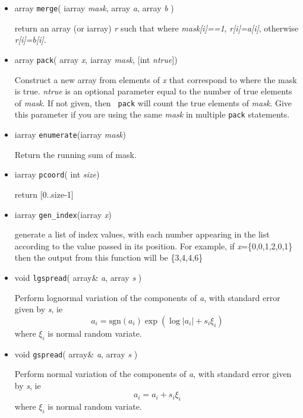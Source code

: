 \begin{itemize}
\item array {\tt merge}( iarray {\em mask}, array {\em
    a}, array {\em b} )
  
  return an array (or iarray) {\em r} such that where {\em
    mask[i]==1}, {\em r[i]=a[i]}, otherwise {\em r[i]=b[i]}.

\item array {\tt pack}( array {\em x}, iarray {\em mask}, [int {\em
ntrue}])

Construct a new array from elements of  {\em x} that correspond to
where the mask is true. {\em ntrue} is an optional parameter equal to
the number of true elements of {\em mask}. If not given, then {\tt
pack} will count the true elements of {\em mask}. Give this parameter
if you are using the same {\em mask} in multiple {\tt pack} statements.

\item iarray {\tt enumerate}(iarray {\em mask})

Return the running sum of mask.

\item iarray {\tt pcoord}( int {\em size})

return [0..size-1]

\item iarray {\tt gen\_index}(iarray {\em x}) 

generate a list of index values, with each number appearing in the
list according to the value passed in its position. For example, if
{\em x}=\{0,0,1,2,0,1\} then the output from this function will be
\{3,4,4,6\}

\item void {\tt lgspread}( array\& {\em a}, array {\em s} )

Perform lognormal variation of the components of {\em a}, with
standard error given by {\em s}, ie
\begin{displaymath}
a_i=\mathrm{sgn}(a_i) \exp(\log|a_i| + s_i\xi_i)
\end{displaymath}
where $\xi_i$ is normal random variate.

\item void {\tt gspread}( array\& {\em a}, array {\em s} )

Perform normal variation of the components of {\em a}, with
standard error given by {\em s}, ie
\begin{displaymath}
a_i = a_i + s_i\xi_i
\end{displaymath}
where $\xi_i$ is normal random variate.



\end{itemize}

